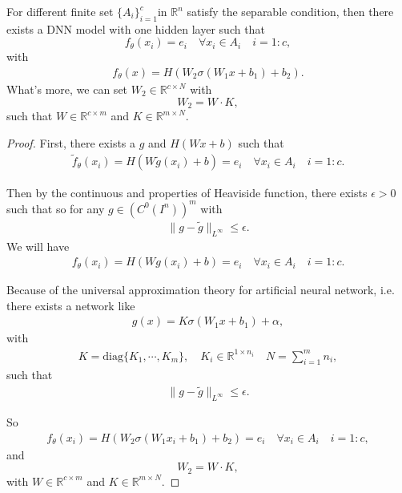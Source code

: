 \begin{theorem}
For different finite set $\{A_i\}_{i=1}^c$in $\mathbb{R}^n$ satisfy the separable condition, then there exists a DNN model with one hidden layer such that 
\begin{equation}
f_\theta(x_i) = e_i \quad \forall x_i \in A_i \quad i = 1:c,
\end{equation}
with 
\begin{align}
f_{\theta}(x) = H(W_2\sigma(W_1x + b_1) + b_2).
\end{align}
What's more, we can set $W_2 \in \mathbb{R}^{c \times N}$ with 
\begin{equation}
W_2 = W \cdot K,
\end{equation}
such that $W \in \mathbb{R}^{c \times m}$ and $K \in \mathbb{R}^{m \times N}$.
\end{theorem}
\begin{proof}
First, there exists a $g$ and $H(Wx + b)$ such that
\begin{align}
\tilde{f}_{\theta}(x_i) = H(W\tilde{g}(x_i) + b) = e_i \quad \forall x_i \in A_i \quad i = 1:c.
\end{align}

Then by the continuous and properties of Heaviside function, there exists $\epsilon > 0$ such that so for any $g \in  (C^0({I^n}))^m$ with 
\begin{align}
\|g - \tilde{g}\|_{L^{\infty}} \le \epsilon.
\end{align}
We will have
\begin{align}
f_{\theta}(x_i) = H(Wg(x_i) + b) = e_i \quad \forall x_i \in A_i \quad i = 1:c.
\end{align}

Because of the universal approximation theory for artificial neural network, i.e. there exists a network like 
\begin{align}
g(x) = K\sigma(W_1 x + b_1) + \alpha,
\end{align}
with 
\begin{align}
K = \mathrm{diag}\{K_1, \cdots, K_m\}, \quad K_i \in \mathbb{R}^{1\times n_i}  \quad N = \sum_{i=1}^m n_i,
\end{align}
such that
\begin{align}
\|g - \tilde{g}\|_{L^{\infty}} \le \epsilon.
\end{align}

So 
\begin{align}
f_{\theta}(x_i) = H(W_2\sigma(W_1x_i + b_1) + b_2) = e_i \quad \forall x_i \in A_i \quad i = 1:c,
\end{align}
and 
\begin{equation}
W_2 = W \cdot K,
\end{equation}
with $W \in \mathbb{R}^{c \times m}$ and $K \in \mathbb{R}^{m \times N}$.

\end{proof}


